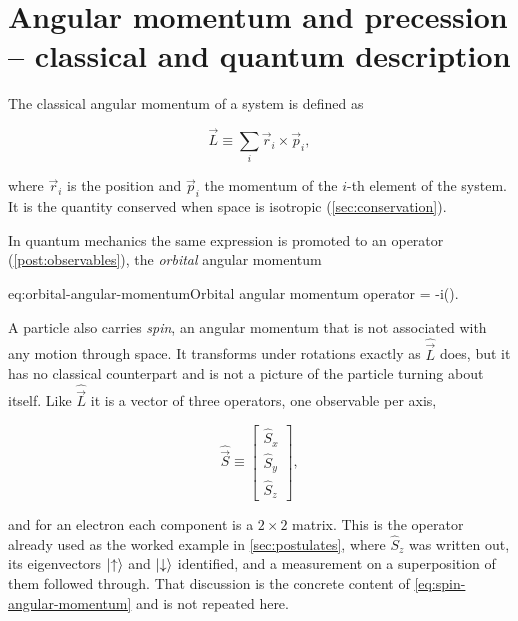 \section{Angular momentum and precession -- classical and quantum description}
\label{sec:angular-momentum}

    The classical angular momentum of a system is defined as

    \begin{equation}\label{eq:momentum}
        \vec{L} \equiv \sum_i \vec{r}_i \times \vec{p}_i,
    \end{equation}

    where $\vec{r}_i$ is the position and $\vec{p}_i$ the momentum of the $i$-th element of the system. It is the quantity conserved when space is isotropic (\cref{sec:conservation}).

    In quantum mechanics the same expression is promoted to an operator (\cref{post:observables}), the \emph{orbital} angular momentum

    \begin{keyeq}{eq:orbital-angular-momentum}{Orbital angular momentum operator}
         = -i\hbar\left(\times \nabla\right).
    \end{keyeq}

    A particle also carries \emph{spin}, an angular momentum that is not associated with any motion through space. It transforms under rotations exactly as $\hat{\vec{L}}$ does, but it has no classical counterpart and is not a picture of the particle turning about itself. Like $\hat{\vec{L}}$ it is a vector of three operators, one observable per axis,

    \begin{equation}\label{eq:spin-angular-momentum}
        \hat{\vec{S}} \equiv
            \begin{bmatrix}
                \hat{S}_{x} \\ \hat{S}_{y} \\ \hat{S}_{z}
            \end{bmatrix},
    \end{equation}

    and for an electron each component is a $2\times2$ matrix. This is the operator already used as the worked example in \cref{sec:postulates}, where $\hat{S}_{z}$ was written out, its eigenvectors $\ket{\uparrow}$ and $\ket{\downarrow}$ identified, and a measurement on a superposition of them followed through. That discussion is the concrete content of \cref{eq:spin-angular-momentum} and is not repeated here.

